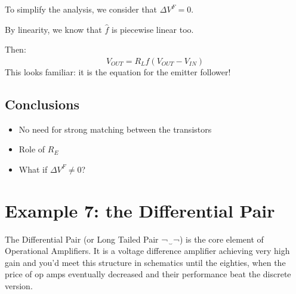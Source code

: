 \documentclass[10pt]{article}
\begin{document}
To simplify the analysis, we consider that $\Delta V^F = 0$.


By linearity, we know that $\hat{f}$ is piecewise linear too.



Then:
$$
	V_{OUT} = R_L\hat{f}(V_{OUT}-V_{IN}) 
$$
This looks familiar: it is the equation for the emitter follower!


\subsection*{Conclusions}

\begin{itemize}
	\item No need for strong matching between the transistors
	\item Role of $R_E$
	\item What if $\Delta V^F \neq 0$?
\end{itemize}



\section*{Example 7: the Differential Pair}

The Differential Pair (or Long Tailed Pair ¬‿¬) is the core element of Operational Amplifiers. It is a voltage difference amplifier achieving very high gain and you'd meet this structure in schematics until the eighties, when the price of op amps eventually decreased and their performance beat the discrete version.
\end{document}
